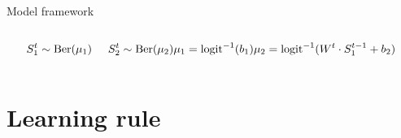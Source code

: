 \documentclass[aspectratio=169]{beamer}
\begin{document}
\begin{frame}{Model framework}
\begin{columns}
        \begin{column}{0.4 \textwidth}
            \begin{equation}
                S_1^t \sim \text{Ber}(\mu_1) \hspace{0.5cm} S_2^t \sim \text{Ber}(\mu_2) \\
                \mu_1 = \text{logit}^{-1}(b_1)\\
                \mu_2 =\text{logit}^{-1}(W^t\cdot S_1^{t-1} + b_2) \nonumber
            \end{equation}
        \end{column}
    \end{columns}
	    
	\end{frame}
	
	\section{Learning rule}
\end{document}
